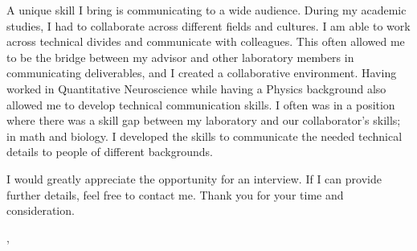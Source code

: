 \documentclass[12pt]{letter}
\begin{document}
A unique skill I bring is communicating to a wide audience.
During my academic studies, I had to collaborate across different
fields and cultures.
I am able to work across technical divides and communicate with colleagues.
This often allowed me to be the bridge between my advisor and other
laboratory members in communicating deliverables,
and I created a collaborative environment.
Having worked in Quantitative Neuroscience while having a Physics
background also allowed me to develop technical communication skills.
I often was in a position where there was a skill gap between my
laboratory and our collaborator's skills; in math and biology.
I developed the skills to communicate the needed technical details to
people of different backgrounds.

I would greatly appreciate the opportunity for an interview.
If I can provide further details, feel free to contact me.
Thank you for your time and consideration.

\vspace{0.1in}
\vfill

\begin{flushright}
  \closer, \\
  \myname\\
  \mytitle
\end{flushright}
\end{document}
